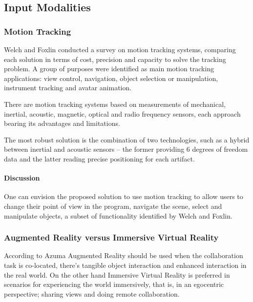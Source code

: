 \subsection{Input Modalities}

\subsubsection{Motion Tracking}


Welch and Foxlin \cite{MT-BULLET} conducted a survey on motion tracking systems,
comparing each solution in terms of cost, precision and capacity to solve the tracking problem.
A group of purposes were identified as main motion tracking applications:
view control, navigation, object selection or manipulation, instrument tracking and avatar animation.

There are motion tracking systems based on measurements of mechanical, inertial, acoustic, magnetic,
optical and radio frequency sensors, each approach bearing its advantages and limitations.

The most robust solution is the combination of two technologies, such as a hybrid between
inertial and acoustic sensors -- the former providing 6 degrees of freedom data and the latter
reading precise positioning for each artifact.


\paragraph{Discussion}

One can envision the proposed solution to use motion tracking to allow users to change their
point of view in the program, navigate the scene, select and manipulate objects, a subset
of functionality identified by Welch and Foxlin.

\subsubsection{Augmented Reality versus Immersive Virtual Reality}

According to Azuma \cite{OVERVIEW-AR} Augmented Reality should be used
when the collaboration task is co-located,
there's tangible object interaction and
enhanced interaction in the real world.
On the other hand Immersive Virtual Reality is preferred in scenarios for
experiencing the world immersively, that is, in an egocentric perspective;
sharing views and
doing remote collaboration.

